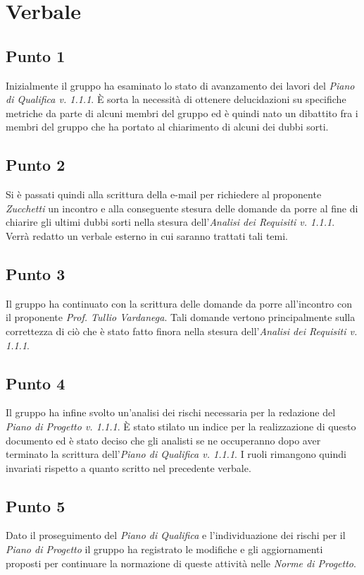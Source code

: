 \section{Verbale}
    \subsection{Punto 1}
        Inizialmente il gruppo ha esaminato lo stato di avanzamento dei lavori del \textit{Piano di Qualifica v. 1.1.1}. È sorta la necessità di ottenere delucidazioni su specifiche metriche da parte di alcuni membri del gruppo ed è quindi nato un dibattito fra i membri del gruppo che ha portato al chiarimento di alcuni dei dubbi sorti.
    \subsection{Punto 2}
        Si è passati quindi alla scrittura della e-mail per richiedere al proponente \textit{Zucchetti} un incontro e alla conseguente stesura delle domande da porre al fine di chiarire gli ultimi dubbi sorti nella stesura dell'\textit{Analisi dei Requisiti v. 1.1.1}. Verrà redatto un verbale esterno in cui saranno trattati tali temi.
    \subsection{Punto 3}
        Il gruppo ha continuato con la scrittura delle domande da porre all'incontro con il proponente \textit{Prof. Tullio Vardanega}. Tali domande vertono principalmente sulla correttezza di ciò che è stato fatto finora nella stesura dell'\textit{Analisi dei Requisiti v. 1.1.1}.
    \subsection{Punto 4}
     	Il gruppo ha infine svolto un'analisi dei rischi necessaria per la redazione del \textit{Piano di Progetto v. 1.1.1}. È stato stilato un indice per la realizzazione di questo documento ed è stato deciso che gli analisti se ne occuperanno dopo aver terminato la scrittura dell'\textit{Piano di Qualifica v. 1.1.1}.
        I ruoli rimangono quindi invariati rispetto a quanto scritto nel precedente verbale.
    \subsection{Punto 5}
        Dato il proseguimento del \textit{Piano di Qualifica} e l'individuazione dei rischi per il \textit{Piano di Progetto} il gruppo ha registrato le modifiche e gli aggiornamenti proposti per continuare la normazione di queste attività nelle \textit{Norme di Progetto}.
    